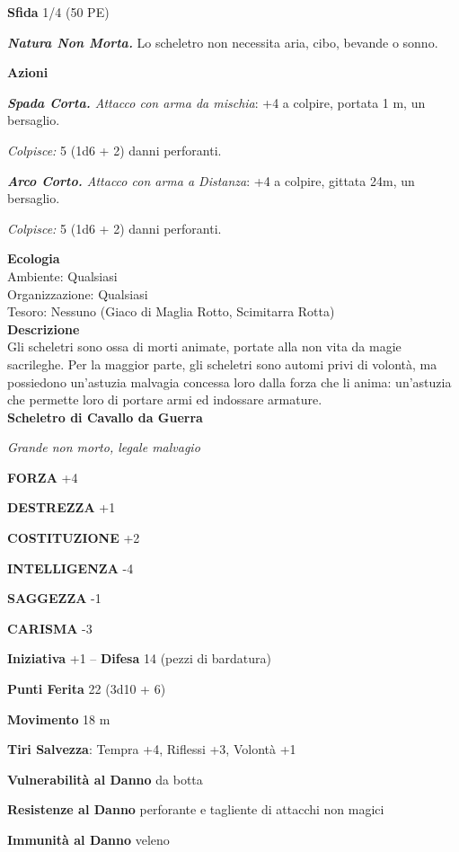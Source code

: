 \begin{multicols}{2}
\textbf{Sfida} 1/4 (50 PE)

\emph{\textbf{Natura Non Morta.}} Lo scheletro non necessita aria, cibo, bevande o sonno.

\textbf{Azioni}

\emph{\textbf{Spada Corta.} Attacco con arma da mischia}: +4 a colpire, portata 1 m, un bersaglio.

\emph{Colpisce:} 5 (1d6 + 2) danni perforanti.

\emph{\textbf{Arco Corto.} Attacco con arma a Distanza}: +4 a colpire, gittata 24m, un bersaglio.

\emph{Colpisce:} 5 (1d6 + 2) danni perforanti.

\textbf{Ecologia}\\
Ambiente: Qualsiasi\\
Organizzazione: Qualsiasi\\
Tesoro: Nessuno (Giaco di Maglia Rotto, Scimitarra Rotta)\\
\textbf{Descrizione}\\
Gli scheletri sono ossa di morti animate, portate alla non vita da magie sacrileghe. Per la maggior parte, gli scheletri sono automi privi di volontà, ma possiedono un'astuzia malvagia concessa loro dalla forza che li anima: un'astuzia che permette loro di portare armi ed indossare armature.\\


\medskip{}\textbf{Scheletro di Cavallo da Guerra}

\emph{Grande non morto, legale malvagio}

\textbf{FORZA} +4

\textbf{DESTREZZA} +1

\textbf{COSTITUZIONE} +2

\textbf{INTELLIGENZA} -4

\textbf{SAGGEZZA} -1

\textbf{CARISMA} -3

\textbf{Iniziativa} +1 -- \textbf{Difesa} 14 (pezzi di bardatura)

\textbf{Punti Ferita} 22 (3d10 + 6)

\textbf{Movimento} 18 m

\textbf{Tiri Salvezza}: Tempra +4, Riflessi +3, Volontà +1

\textbf{Vulnerabilità al Danno} da botta

\textbf{Resistenze al Danno} perforante e tagliente di attacchi non magici

\textbf{Immunità al Danno} veleno


\end{multicols}
